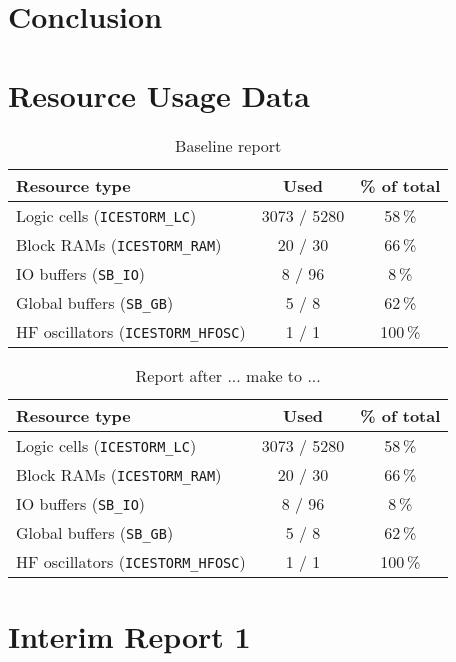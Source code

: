\documentclass[a4paper,10pt]{article}
\begin{document}
\section{Conclusion}
\label{sec:Conclusion}

\newpage
\appendix
\section{Resource Usage Data}

\begin{table}[H] 
    \centering
    \begin{tabularx}{0.6\textwidth}{X c c}
        \toprule
        Resource type & Used & \% of total \\ \midrule
        Logic cells (\texttt{ICESTORM\_LC}) & 3073 / 5280 & 58\,\% \\
        Block RAMs (\texttt{ICESTORM\_RAM}) & 20 / 30 & 66\,\% \\
        IO buffers (\texttt{SB\_IO}) & 8 / 96 & 8\,\% \\
        Global buffers (\texttt{SB\_GB}) & 5 / 8 & 62\,\% \\
        HF oscillators (\texttt{ICESTORM\_HFOSC}) & 1 / 1 & 100\,\% \\
        \bottomrule
    \end{tabularx}
    \caption{Baseline report}
    \label{tab:bubblesort_pnr_report}
\end{table}

\begin{table}[H] 
    \centering
    \begin{tabularx}{0.6\textwidth}{X c c}
        \toprule
        Resource type & Used & \% of total \\ \midrule
        Logic cells (\texttt{ICESTORM\_LC}) & 3073 / 5280 & 58\,\% \\
        Block RAMs (\texttt{ICESTORM\_RAM}) & 20 / 30 & 66\,\% \\
        IO buffers (\texttt{SB\_IO}) & 8 / 96 & 8\,\% \\
        Global buffers (\texttt{SB\_GB}) & 5 / 8 & 62\,\% \\
        HF oscillators (\texttt{ICESTORM\_HFOSC}) & 1 / 1 & 100\,\% \\
        \bottomrule
    \end{tabularx}
    \caption{Report after ... make to ...}
    \label{tab:bubblesort_pnr_report}
\end{table}

\section{Interim Report 1}
\label{sec:{Interim_Report_1}}

\end{document}
